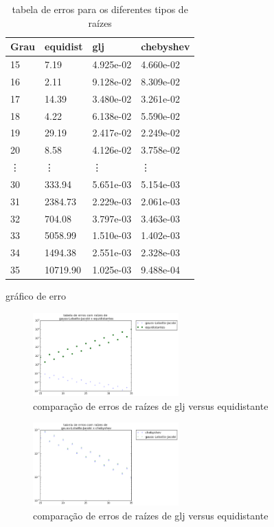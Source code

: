 \pagebreak
\begin{table}[h]
\centering
\caption{tabela de erros para os diferentes tipos de raízes}
\label{my-label}
\begin{tabular}{|l|l|l|l|}
\hline
Grau & equidist & glj       & chebyshev     \\ \hline
15   & 7.19     & 4.925e-02 & 4.660e-02 \\
16   & 2.11     & 9.128e-02 & 8.309e-02 \\
17   & 14.39    & 3.480e-02 & 3.261e-02 \\
18   & 4.22     & 6.138e-02 & 5.590e-02 \\
19   & 29.19    & 2.417e-02 & 2.249e-02 \\
20   & 8.58     & 4.126e-02 & 3.758e-02 \\
\vdots   & \vdots              & \vdots    & \vdots    \\
30   & 333.94   & 5.651e-03 & 5.154e-03 \\
31   & 2384.73  & 2.229e-03 & 2.061e-03 \\
32   & 704.08   & 3.797e-03 & 3.463e-03 \\
33   & 5058.99  & 1.510e-03 & 1.402e-03 \\
34   & 1494.38  & 2.551e-03 & 2.328e-03 \\
35   & 10719.90 & 1.025e-03 & 9.488e-04 \\ \hline
\end{tabular}
\end{table}
gráfico de erro
\begin{figure}[!ht]
  \includegraphics[width=0.5\textwidth,center]{figuras/glj_equi.png}
  \caption{comparação de erros de raízes de glj versus equidistante}
\end{figure}
\begin{figure}[!hb]
  \includegraphics[width=0.5\textwidth,center]{figuras/glj_cheb.png}
  \caption{comparação de erros de raízes de glj versus equidistante}
\end{figure}

